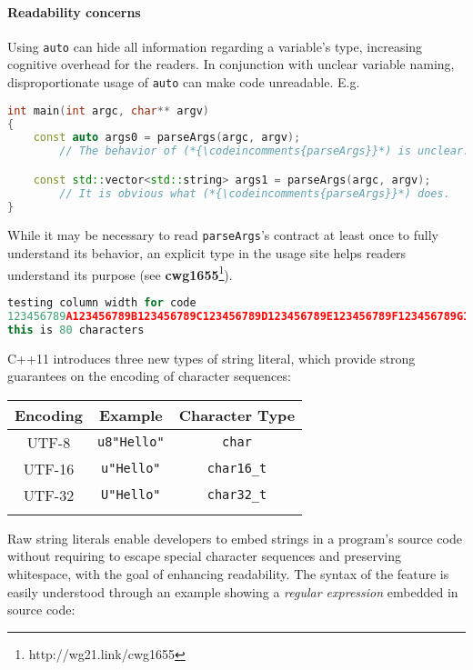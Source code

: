 \documentclass[twoside,10pt,letterpaper,usenames]{newstyle-PearsonGeneric-7-38}
\newcommand{\codeincomments}{\color{skyblue}\ttfamily}
\let\Begin\begin
\let\End\end
\begin{document}
\paragraph[Readability concerns]{Readability concerns}\label{readability-concerns}

Using \texttt{auto} can hide all information regarding a variable's
type, increasing cognitive overhead for the readers. In conjunction with
unclear variable naming, disproportionate usage of \texttt{auto} can
make code unreadable. E.g.

\begin{lstlisting}[language=C++]
int main(int argc, char** argv)
{
    const auto args0 = parseArgs(argc, argv);
        // The behavior of (*{\codeincomments{parseArgs}}*) is unclear.

    const std::vector<std::string> args1 = parseArgs(argc, argv);
        // It is obvious what (*{\codeincomments{parseArgs}}*) does.
}
\end{lstlisting}
    

While it may be necessary to read \texttt{parseArgs}'s contract at least
once to fully understand its behavior, an explicit type in the usage
site helps readers understand its purpose (see
\textbf{{cwg1655}}{\cprotect\footnote{http://wg21.link/cwg1655}}).

\begin{lstlisting}[language=C++]
testing column width for code
123456789A123456789B123456789C123456789D123456789E123456789F123456789G123456789H
this is 80 characters
\end{lstlisting}
    

C++11 introduces three new types of string literal, which provide strong
guarantees on the encoding of character sequences:

\Begin{center}
\Begin{tabular}{c|c|c}
\thickhline

\textbf{Encoding} & \textbf{Example} & \textbf{Character Type} \\ \hline
UTF-8 & \texttt{u8"Hello"} & \texttt{char} \\ \hline UTF-16 &
\texttt{u"Hello"} & \texttt{char16\_t} \\ \hline UTF-32 &
\texttt{U"Hello"} & \texttt{char32\_t} \\

\thickhline
\End{tabular}
\End{center}

Raw string literals enable developers to embed strings in a program's
source code without requiring to escape special character sequences and
preserving whitespace, with the goal of enhancing readability. The
syntax of the feature is easily understood through an example showing a
\emph{regular expression} embedded in source code:
\end{document}
